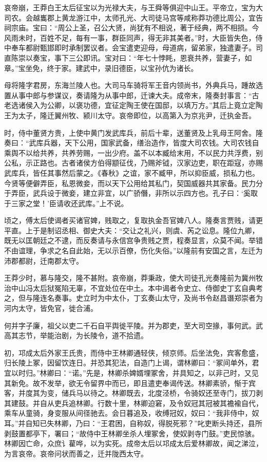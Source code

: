 \documentclass[12pt,UTF8]{ctexbook}
\begin{document}
哀帝崩，王莽白王太后征宝以为光禄大夫，与王舜等俱迎中山王。平帝立，宝为大司农。会越巂郡上黄龙游江中，太师孔光、大司徒马宫等咸称莽功德比周公，宜告祠宗庙。宝曰：“周公上圣，召公大贤，尚犹有不相说，著于经典，两不相损。今风雨未时，百姓不足，每有一事，群臣同声，得无非其美者。”时，大臣皆失色，侍中奉车都尉甄邯即时承制罢议者。会宝遣吏迎母，母道病，留弟家，独遣妻子。司直陈崇以奏宝，事下三公即讯。宝对曰：“年七十悖眊，恩衰共养，营妻子，如章。”宝坐免，终于家。建武中，录旧德臣，以宝孙伉为诸长。



母将隆字君房，东海兰陵人也。大司马车骑将军王音内领尚书，外典兵马，踵故选置从事中郎与参谋议，奏请隆为从事中郎，迁谏大夫。成帝末，隆奏封事言：“古老选诸侯入为公卿，以褒功德，宜征定陶王使在国邸，以填万方。”其后上竟立定陶王为太子，隆迁翼州牧、颍川太守。哀帝即位，以高第入为京兆尹，迁执金吾。



时，侍中董贤方贵，上使中黄门发武库兵，前后十辈，送董贤及上乳母王阿舍。隆奏曰：“武库兵器，天下公用，国家武备，缮治造作，皆度大司农钱。大司农钱自乘舆不以给共养，共养劳赐，一出少府。盖不以本臧给末用，不以民力共浮费，别公私，示正路也。古者诸侯方伯得颛征伐，乃赐斧钺，汉家边吏，职在距寇，亦赐武库兵，皆任其事然后蒙之。《春秋》之谊，家不臧甲，所以抑臣威，损私力也。今贤等便僻弄臣，私恩微妾，而以天下公用给其私门，契国威器共其家备。民力分于弄臣，武兵设于微妾，建立非宜，以广骄僭，非所以示四方也。孔子曰：‘奚取于三家之堂！’臣请收还武库。”上不说。



顷之，傅太后使谒者买诸官婢，贱取之，复取执金吾官婢八人。隆奏言贾贱，请更平直。上于是制诏丞相、御史大夫：“交让之礼兴，则虞、芮之讼息。隆位九卿，既无以匡朝廷之不逮，而反奏请与永信宫争贵贱之贾，程奏显言，众莫不闻。举错不由谊理，争求之名自此始，无以示百僚，伤化失俗。”以隆前有安国之言，左迁为沛郡都尉，迁南郡太守。



王莽少时，慕与隆交，隆不甚附。哀帝崩，莽秉政，使大司徒孔光奏隆前为冀州牧治中山冯太后狱冤陷无辜，不宜处位在中土。本中谒者令史立、侍御史丁玄自典考之，但与隆连名奏事。史立时为中太仆，丁玄奏山太守，及尚书令赵昌谮郑崇者为河内太守，皆免官，徙合浦。



何并字子廉，祖父以吏二千石自平舆徙平陵。并为郡吏，至大司空掾，事何武。武高其志节，举能治剧，为长陵令，道不拾遗。



初，邛成太后外家王氏贵，而侍中王林卿通轻侠，倾京师。后坐法免，宾客愈盛，归长陵上冢，因留饮连日。并恐其犯法，自造门上谒，谓林卿曰：“冢间单外，君宜以时归。”林卿曰：“诺。”先是，林卿杀婢婿埋冢舍，并具知之，以非己时，又见其新免。故不发举，欲无令留界中而已，即且遣吏奉谒传送。林卿素骄，惭于宾客，并度其为变，储兵马以待之。林卿既去，北度泾桥，令骑奴还至寺门，拔刀剥其建鼓。并自从吏兵追林卿。行数十里，林卿迫窘，及令奴冠其冠被其襜褕自代，乘车从童骑，身变服从间径驰去。会日暮追及，收缚冠奴，奴曰：“我非侍中，奴耳。”并自知已失林卿，乃曰：“王君困，自称奴，得脱死邪？”叱吏断头持还，县所剥鼓置都亭下，署曰；“故侍中王林卿坐杀人埋冢舍，使奴剥寺门鼓。”吏民惊骇。林卿因亡命，众庶讠雚哗，以为实死。成帝太后以邛成太后爱林卿故，闻之涕泣，为言哀帝。哀帝问状而善之，迁并陇西太守。
\end{document}
